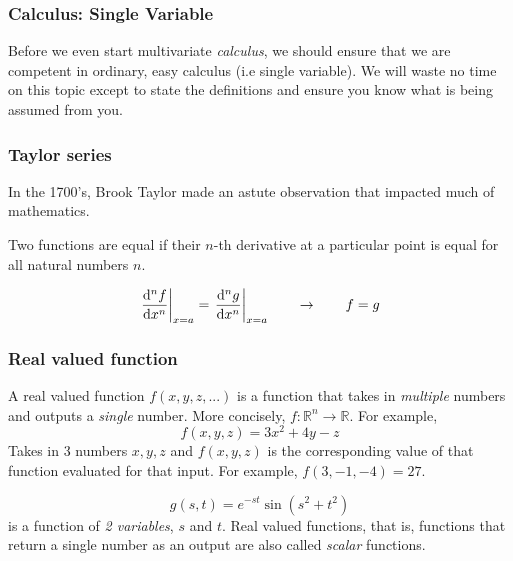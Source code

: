 \documentclass[14pt]{article}
\begin{document}
	\subsubsection{Calculus: Single Variable}
	Before we even start multivariate \textit{calculus}, we should ensure that we are competent in ordinary, easy calculus (i.e single variable). We will waste no time on this topic except to state the definitions and ensure you know what is being assumed from you.
	
	
	\subsubsection{Taylor series}  
	In the 1700's, Brook Taylor made an astute observation that impacted much of mathematics.
	
	\begin{tcolorbox}[colframe=black]
		Two functions are equal if their $n$-th derivative at a particular point is equal for all natural numbers $n$.
		
		\begin{equation*}
			 \odv[order={n}, delims-eval=.|]{f}{x}_{x=a} = \odv[order={n}, delims-eval=.|]{g}{x}_{x=a} \hspace{2em}  \rightarrow \hspace{2em}  f = g  
		\end{equation*}
	\end{tcolorbox}
	
	
	\subsubsection{Real valued function} 
	A real valued function $f(x, y, z, ...)$ is a function that takes in \textit{multiple} numbers and outputs a \textit{single} number. More concisely, $ f: \mathbb{R}^n \rightarrow \mathbb{R}$. For example,
	\begin{equation*}
		f(x, y, z) = 3x^2 + 4y - z
	\end{equation*}
	Takes in 3 numbers $x, y, z$ and $f(x, y, z)$ is the corresponding value of that function evaluated for that input. For example, $f(3, -1, -4) = 27$.
	
	\begin{equation*}
		g(s, t) = e^{-st}\sin(s^2 + t^2)
	\end{equation*}
	is a function of \textit{2 variables}, $s$ and $t$. Real valued functions, that is, functions that return a single number as an output are also called \textit{scalar} functions. 
	
\end{document}
